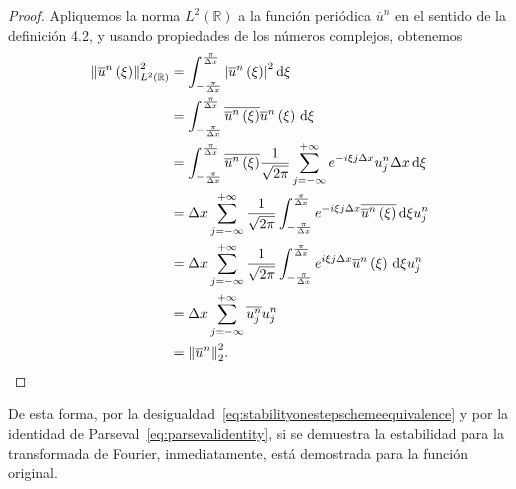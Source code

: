 \begin{proof}
  Apliquemos la norma $L^{2}\left(\mathbb{R}\right)$ a la función
  periódica $\overline{u}^{n}$ en el sentido de la definición 4.2, y
  usando propiedades de los números complejos, obtenemos
  \begin{align*}
    {\left\|
      \overline{u}^{n}
      \left(\xi\right)
    \right\|}^{2}_{L^{2}\left(\mathbb{R}\right)} & =
    \int_{-\frac{\pi}{\Delta x}}^{\frac{\pi}{\Delta x}}
    {\left|
      \overline{u}^{n}
      \left(\xi\right)
      \right|}^{2}
    \dl\xi                                           \\
                                                 & =
    \int_{-\frac{\pi}{\Delta x}}^{\frac{\pi}{\Delta x}}
    \overline{\overline{u}^{n}\left(\xi\right)}
    \overline{u}^{n}
    \left(\xi\right)
    \dl\xi                                           \\
                                                 & =
    \int_{-\frac{\pi}{\Delta x}}^{\frac{\pi}{\Delta x}}
    \overline{\overline{u}^{n}\left(\xi\right)}
    \frac{1}{\sqrt{2\pi}}
    \sum_{j=-\infty}^{+\infty}
    e^{-i\xi j\Delta x}
    u^{n}_{j}
    \Delta x
    \dl\xi                                           \\
                                                 & =
    \Delta x
    \sum_{j=-\infty}^{+\infty}
    \frac{1}{\sqrt{2\pi}}
    \int_{-\frac{\pi}{\Delta x}}^{\frac{\pi}{\Delta x}}
    e^{-i\xi j \Delta x}
    \overline{\overline{u}^{n}\left(\xi\right)}
    \dl\xi
    u^{n}_{j}                                        \\
                                                 & =
    \Delta x
    \sum_{j=-\infty}^{+\infty}
    \frac{1}{\sqrt{2\pi}}
    \int_{-\frac{\pi}{\Delta x}}^{\frac{\pi}{\Delta x}}
    e^{i\xi j \Delta x}
    \overline{u}^{n}
    \left(\xi\right)
    \dl\xi
    u^{n}_{j}                                        \\
                                                 & =
    \Delta x
    \sum_{j=-\infty}^{+\infty}
    \overline{u^{n}_{j}}
    u^{n}_{j}                                        \\
                                                 & =
    {\left\|\overline{u}^{n}\right\|}^{2}_{2}.
  \end{align*}
\end{proof}

De esta forma, por la
desigualdad~\eqref{eq:stabilityonestepschemeequivalence} y por la
identidad de Parseval~\eqref{eq:parsevalidentity}, si se demuestra la
estabilidad para la transformada de Fourier, inmediatamente, está
demostrada para la función original.

